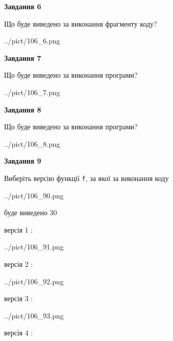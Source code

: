 \documentclass[12pt, ukrainian]{article}
\def\code#1{\Verb!#1!}
\begin{document}
{\begin {large}
{\begin {center}\textbf{Завдання 6}\end {center}}

Що буде виведено за виконання фрагменту коду?\par
\begin{center}
	{../pict/106_6.png}
\end{center}
\newpage

{\begin {center}\textbf{Завдання 7}\end {center}}

Що буде виведено за виконання програми?\par
\begin{center}
	{../pict/106_7.png}
\end{center}
\newpage

{\begin {center}\textbf{Завдання 8}\end {center}}

Що буде виведено за виконання програми?\par
\begin{center}
	{../pict/106_8.png}
\end{center}
\newpage

{\begin {center}\textbf{Завдання 9}\end {center}}

Виберіть версію функції \code{f}, за якої за виконання коду
\begin{center}
	{../pict/106_90.png}
\end{center}
буде виведено 30

\vspace{5mm}
версія 1 :

\begin{center}
	{../pict/106_91.png}
\end{center}
версія 2 :

\begin{center}
	{../pict/106_92.png}
\end{center}
версія 3 :

\begin{center}
	{../pict/106_93.png}
\end{center}
версія 4 :


\end{large}}
\end{document}
